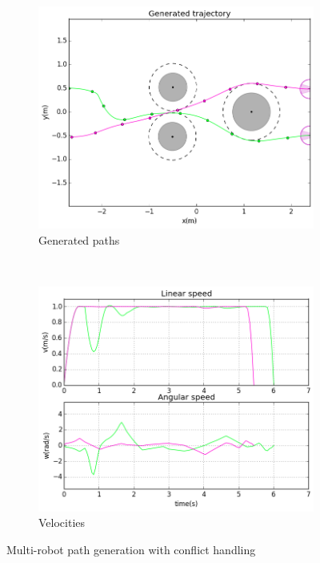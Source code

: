 \begin{figure}[!h]
        \centering
        ~ %
        \begin{subfigure}[b]{0.48\textwidth}
                \includegraphics[width=\textwidth]{./images/pnc.png}
                \caption{Generated paths}\label{fig:pnc}
        \end{subfigure}
        ~ %
        \begin{subfigure}[b]{0.48\textwidth}
                \includegraphics[width=\textwidth]{./images/vnc.png}
                \caption{Velocities}\label{fig:vnc}
        \end{subfigure}
        \caption{Multi-robot path generation with conflict handling}\label{fig:nc}
\end{figure}

